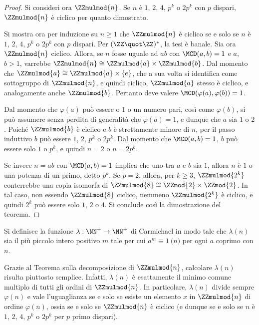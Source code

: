 \documentclass[12pt]{scrartcl}
\begin{document}
\begin{proof}
		
		Si consideri ora $\ZZmulmod{n}$. Se $n$ è $1$, $2$,
		$4$, $p^k$ o $2p^k$ con $p$ dispari, $\ZZmulmod{n}$ è
		ciclico per quanto dimostrato. \medskip
		
		
		Si mostra ora per induzione su $n \geq 1$ che $\ZZmulmod{n}$ è ciclico
		se e solo se $n$ è $1$, $2$,
		$4$, $p^k$ o $2p^k$ con $p$ dispari. Per $(\ZZ \quot \ZZ)^*$,
		la tesi è banale. 
		Sia ora $\ZZmulmod{n}$
		ciclico. Allora, se $n$ fosse uguale ad $ab$ con
		$\MCD(a, b) = 1$ e $a$, $b > 1$, varrebbe $\ZZmulmod{n} \cong
		\ZZmulmod{a} \times \ZZmulmod{b}$. Dal momento che
		$\ZZmulmod{a} \cong \ZZmulmod{a} \times \{e\}$,
		che a sua volta si identifica come sottogruppo di
		$\ZZmulmod{n}$, e quindi ciclico, $\ZZmulmod{a}$ stesso
		è ciclico, e analogamente anche $\ZZmulmod{b}$. Pertanto
		deve valere $\MCD(\varphi(a), \varphi(b)) = 1$. \medskip
		
		
		Dal momento che $\varphi(a)$ può essere o $1$ o un
		numero pari, così come $\varphi(b)$, si può assumere
		senza perdita di generalità che $\varphi(a) = 1$,
		e dunque che $a$ sia $1$ o $2$. Poiché $\ZZmulmod{b}$
		è ciclico e $b$ è strettamente minore di
		$n$, per il passo induttivo $b$ può essere
		$1$, $2$, $p^k$ o $2p^k$. Dal momento che $\MCD(a, b) = 1$,
		$b$ può essere solo $1$ o $p^k$, e quindi $n = 2$ o
		$n = 2 p^k$. \medskip
		
		
		Se invece $n = ab$ con $\MCD(a, b) = 1$ implica che
		uno tra $a$ e $b$ sia $1$, allora $n$ è $1$ o una
		potenza di un primo, detto $p^k$. Se $p = 2$,
		allora, per $k \geq 3$, $\ZZmulmod{2^k}$
		conterrebbe una copia isomorfa di $\ZZmulmod{8} \cong
		\ZZmod{2} \times \ZZmod{2}$. In tal caso,
		non essendo $\ZZmulmod{8}$ ciclico, nemmeno $\ZZmulmod{2^k}$
		è ciclico, e quindi $2^k$ può essere solo $1$, $2$ o
		$4$. Si conclude così la dimostrazione del teorema.
	\end{proof}
	
	\begin{remark}
		Si definisce la funzione $\lambda : \NN^+ \to \NN^+$ di Carmichael in
		modo tale che $\lambda(n)$ sia il più piccolo intero positivo $m$ tale
		per cui $a^m \equiv 1 \pod{n}$ per ogni $a$ coprimo con $n$. \medskip
		
		
		Grazie al Teorema sulla decomposizione di $\ZZmulmod{n}$, calcolare
		$\lambda(n)$ risulta piuttosto semplice. Infatti, $\lambda(n)$ è
		esattamente il minimo comune multiplo di tutti gli ordini di
		$\ZZmulmod{n}$. In particolare, $\lambda(n)$ divide sempre $\varphi(n)$ e
		vale l'uguaglianza se e solo se esiste un elemento $x$ in $\ZZmulmod{n}$ di
		ordine $\varphi(n)$, ossia se e solo se $\ZZmulmod{n}$ è ciclico (e dunque se
		e solo se
		$n$ è $1$, $2$, $4$, $p^k$ o $2p^k$ per $p$ primo dispari).
	\end{remark}
	
\end{document}
